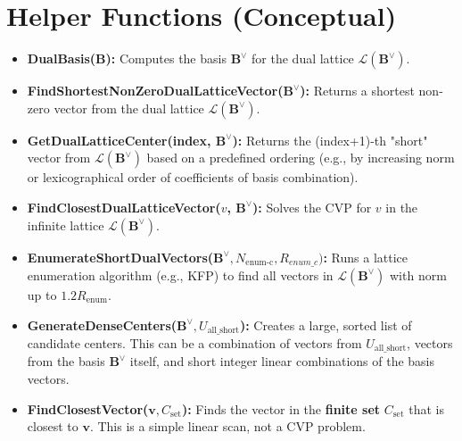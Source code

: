 \documentclass{article}
\begin{document}
\clearpage

\section{Helper Functions (Conceptual)}
\begin{itemize}
    \item \textbf{DualBasis($\mathbf{B}$):} Computes the basis $\mathbf{B}^{\vee}$ for the dual lattice $\mathcal{L}(\mathbf{B}^{\vee})$.
    \item \textbf{FindShortestNonZeroDualLatticeVector($\mathbf{B}^{\vee}$):} Returns a shortest non-zero vector from the dual lattice $\mathcal{L}(\mathbf{B}^{\vee})$.
    \item \textbf{GetDualLatticeCenter(index, $\mathbf{B}^{\vee}$):} Returns the (index+1)-th "short" vector from $\mathcal{L}(\mathbf{B}^{\vee})$ based on a predefined ordering (e.g., by increasing norm or lexicographical order of coefficients of basis combination).
    \item \textbf{FindClosestDualLatticeVector($v$, $\mathbf{B}^{\vee}$):} Solves the CVP for $v$ in the infinite lattice $\mathcal{L}(\mathbf{B}^{\vee})$.
    \item \textbf{EnumerateShortDualVectors($\mathbf{B}^{\vee}, N_{\text{enum-c}}, R_{enum\_c})$:} Runs a lattice enumeration algorithm (e.g., KFP) to find all vectors in $\mathcal{L}(\mathbf{B}^{\vee})$ with norm up to $1.2R_{\text{enum}}$.
    \item \textbf{GenerateDenseCenters($\mathbf{B}^{\vee}, U_{\text{all\_short}}$):} Creates a large, sorted list of candidate centers. This can be a combination of vectors from $U_{\text{all\_short}}$, vectors from the basis $\mathbf{B}^{\vee}$ itself, and short integer linear combinations of the basis vectors.
    \item \textbf{FindClosestVector($\mathbf{v}, C_{\text{set}}$):} Finds the vector in the \textbf{finite set} $C_{\text{set}}$ that is closest to $\mathbf{v}$. This is a simple linear scan, not a CVP problem.
\end{itemize}
\end{document}
